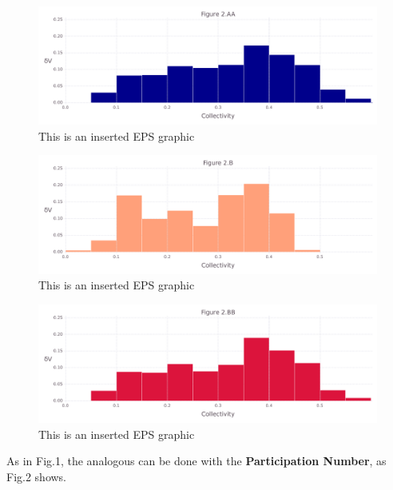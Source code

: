 \documentclass[10pt,letterpaper]{article}
\begin{document}
\begin{figure}[ht]
\begin{center}
\includegraphics[scale=0.5]{1m14/2aafigure_hi-precision.pdf}
\caption{This is an inserted EPS graphic}
\label{fig4}
\end{center}
\end{figure}

\begin{figure}[ht]
\begin{center}
\includegraphics[scale=0.5]{1m14/2bfigure_hi-precision.pdf}
\caption{This is an inserted EPS graphic}
\label{fig5}
\end{center}
\end{figure}

\begin{figure}[ht]
\begin{center}
\includegraphics[scale=0.5]{1m14/2bbfigure_hi-precision.pdf}
\caption{This is an inserted EPS graphic}
\label{fig6}
\end{center}
\end{figure}

\clearpage
As in Fig.1, the analogous can be done with the \textbf{Participation Number}, as Fig.2 shows.
\end{document}
